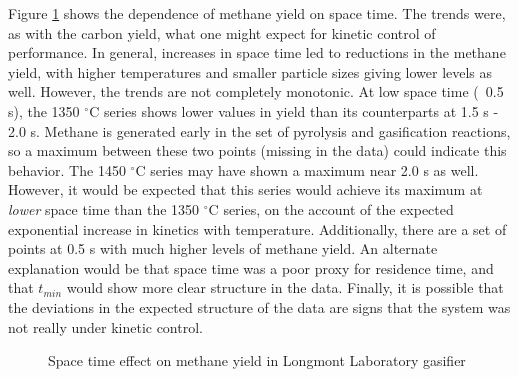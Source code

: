 \documentclass[11pt,twocolumn]{article}
\begin{document}


Figure \ref{fig-Lab-CH4-tau} shows the dependence of methane yield on space time.  The trends were, as with the carbon yield, what one might expect for kinetic control of performance.  In general, increases in space time led to reductions in the methane yield, with higher temperatures and smaller particle sizes giving lower levels as well.  However, the trends are not completely monotonic.  At low space time (~0.5 s), the 1350 $^{\circ}$C series shows lower values in yield than its counterparts at 1.5 s - 2.0 s.  Methane is generated early in the set of pyrolysis and gasification reactions, so a maximum between these two points (missing in the data) could indicate this behavior.  The 1450 $^{\circ}$C series may have shown a maximum near 2.0 s as well.  However, it would be expected that this series would achieve its maximum at \emph{lower} space time than the 1350 $^{\circ}$C series, on the account of the expected exponential increase in kinetics with temperature.  Additionally, there are a set of points at 0.5 s with much higher levels of methane yield.  An alternate explanation would be that space time was a poor proxy for residence time, and that $t_{min}$ would show more clear structure in the data.  Finally, it is possible that the deviations in the expected structure of the data are signs that the system was not really under kinetic control.

\begin{figure}[hbp]

\caption{Space time effect on methane yield in Longmont Laboratory gasifier}
\label{fig-Lab-CH4-tau}
\end{figure}

\end{document}
